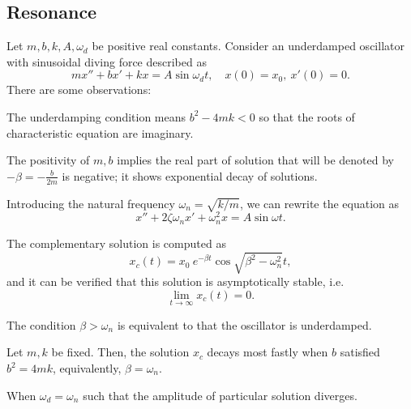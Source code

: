 \documentclass[a4paper]{article}
\begin{document}
\subsection{Resonance}
Let $m,b,k,A,\omega_d$ be positive real constants.
Consider an underdamped oscillator with sinusoidal diving force described as
\[mx''+bx'+kx=A\sin\omega_dt,\quad x(0)=x_0,\ x'(0)=0.\]
There are some observations:
\begin{parts}
\item The underdamping condition means $b^2-4mk<0$ so that the roots of characteristic equation are imaginary.
\item The positivity of $m,b$ implies the real part of solution that will be denoted by $-\beta=-\frac b{2m}$ is negative; it shows exponential decay of solutions.
\item Introducing the natural frequency $\omega_n=\sqrt{k/m}$, we can rewrite the equation as
\[x''+2\zeta\omega_n x'+\omega_n^2x=A\sin\omega t.\]
\item The complementary solution is computed as
\[x_c(t)=x_0\ e^{-\beta t}\cos\sqrt{\beta^2-\omega_n^2}t,\]
and it can be verified that this solution is asymptotically stable, i.e.
\[\lim_{t\to\infty}x_c(t)=0.\]
\item The condition $\beta>\omega_n$ is equivalent to that the oscillator is underdamped.
\item Let $m,k$ be fixed. Then, the solution $x_c$ decays most fastly when $b$ satisfied $b^2=4mk$, equivalently, $\beta=\omega_n$.
\item When $\omega_d=\omega_n$ such that the amplitude of particular solution diverges.
\end{parts}
\end{document}

